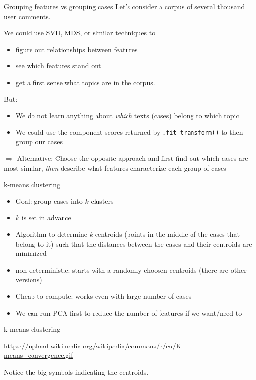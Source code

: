 \begin{frame}{Grouping features vs grouping cases}
Let's consider a corpus of several thousand user comments.

We could use SVD, MDS, or similar techniques to 
\begin{itemize}
\item figure out relationships between features
\item see which features stand out
\item get a first sense what topics are in the corpus.
\end{itemize}
\pause

But:
\begin{itemize}
\item<+-> We do not learn anything about \emph{which} texts (cases) belong to which topic
\item<+-> We could use the component scores returned by \texttt{.fit\_transform()} to then group our cases
\end{itemize}

\pause 
$\Rightarrow$ \footnotesize{Alternative: Choose the opposite approach and first find out which cases are most similar, \textit{then} describe what features characterize each group of cases}


\end{frame}




\begin{frame}{k-means clustering}
\begin{itemize}[<+->]
\item Goal: group cases into $k$ clusters
\item $k$ is set in advance
\item Algorithm to determine \textit{k} centroids (points in the middle of the cases that belong to it) such that the distances between the cases and their centroids are minimized
\item non-deterministic: starts with a randomly choosen centroids (there are other versions)
\item Cheap to compute: works even with large number of cases
\item We can run PCA first to reduce the number of features if we want/need to
\end{itemize}
\end{frame}




\begin{frame}{k-means clustering}

{\tiny{\url{https://upload.wikimedia.org/wikipedia/commons/e/ea/K-means\_convergence.gif}}}

Notice the big symbols indicating the centroids.
\end{frame}



